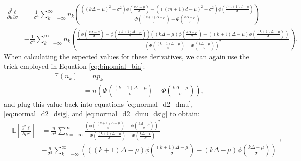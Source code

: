\documentclass[11pt,a4,twosided,singlespacing,titlepagenumber=on,numbers=endperiod]{scrreprt}
\numberwithin{equation}{chapter} %
\theoremstyle{remark}
\begin{document}
\begin{equation}\label{eq:normal_d2_dmu_dsig}
	\begin{aligned}
		\frac{\partial^2 \ell}{\partial \mu \partial \sigma } &= \frac{1}{\sigma^4} \sum_{k=-\infty}^\infty n_k \left( 
		\frac{((k \Delta - \mu)^2 - \sigma^2) \phi \left( \frac{k \Delta - \mu}{\sigma} \right) - (((m+1)d - \mu)^2 - \sigma^2) \phi \left( \frac{(m+1)d - \mu}{\sigma} \right)}
		 {\Phi \left( \frac{(k + 1) \Delta - \mu}{\sigma} \right) - \Phi \left(\frac{k \Delta - \mu}{\sigma} \right)}
		 \right) \\
		 &- \frac{1}{\sigma^3} \sum_{k=-\infty}^\infty n_k \left(
		 \frac{\left(\phi \left( \frac{k \Delta - \mu}{\sigma} \right) - \phi \left( \frac{(k + 1) \Delta - \mu}{\sigma} \right)\right) \left( (k \Delta - \mu) \phi \left( \frac{k \Delta - \mu}{\sigma} \right) - ((k + 1) \Delta - \mu)\phi \left( \frac{(k + 1) \Delta - \mu}{\sigma} \right)\right)}
		 {\left(\Phi \left( \frac{(k + 1) \Delta - \mu}{\sigma} \right) - \Phi \left(\frac{k \Delta - \mu}{\sigma} \right)\right)^2}
		 \right).
	\end{aligned}
\end{equation}
When calculating the expected values for these derivatives, we can again use the trick employed in Equation \ref{eq:binomial_bin}:
\begin{equation*}
	\begin{aligned}
		\mathbb{E}(n_k) &= n p_k \\
		&= n \left( \Phi\left(\frac{(k+1) \Delta - \mu}{\sigma}\right) - \Phi\left(\frac{k \Delta - \mu}{\sigma}\right) \right),
	\end{aligned}
\end{equation*}
and plug this value back into equations \ref{eq:normal_d2_dmu}, \ref{eq:normal_d2_dsig}, and \ref{eq:normal_d2_dmu_dsig} to obtain:
\begin{equation}\label{eq:normal_mu_fisher}
	\begin{aligned}
		-\mathbb{E}\left[\frac{\partial^2 \ell}{\partial \mu^2}\right] &= \frac{n}{\sigma^2} \sum_{k=-\infty}^\infty 
		 \frac{\left(\phi \left( \frac{(k + 1) \Delta - \mu}{\sigma} \right) - \phi \left( \frac{k \Delta - \mu}{\sigma} \right)\right)^2}
		 {\Phi \left( \frac{(k + 1) \Delta - \mu}{\sigma} \right) - \Phi \left(\frac{k \Delta - \mu}{\sigma} \right)}
		  \\
		&- \frac{n}{\sigma^3} \sum_{k=-\infty}^\infty \left(
			((k + 1) \Delta - \mu) \phi \left( \frac{(k + 1) \Delta - \mu}{\sigma} \right) - (k \Delta - \mu) \phi \left( \frac{k \Delta - \mu}{\sigma} \right)
		\right)
	\end{aligned},
\end{equation}
\end{document}
